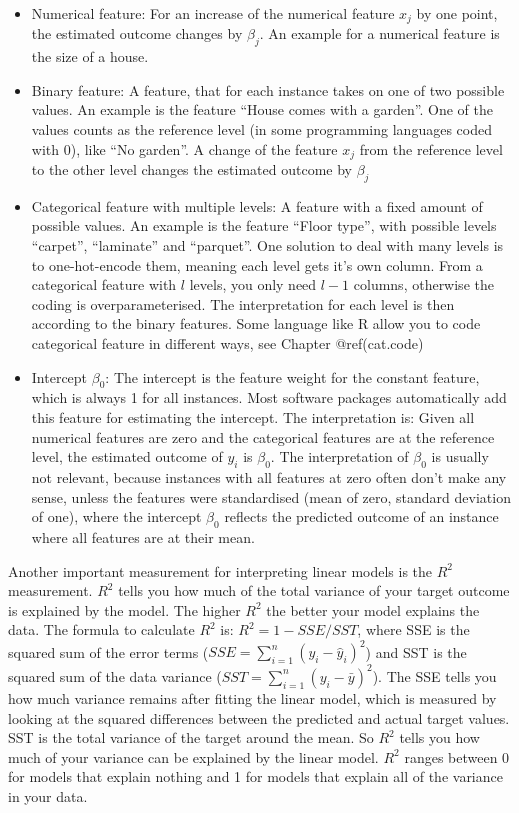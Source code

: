 \documentclass[12pt,]{krantz}
\providecommand{\tightlist}{%
  \setlength{\itemsep}{0pt}\setlength{\parskip}{0pt}}
\theoremstyle{definition}
\theoremstyle{definition}
\theoremstyle{definition}
\theoremstyle{remark}
\begin{document}
\begin{itemize}
\tightlist
\item
  Numerical feature: For an increase of the numerical feature \(x_{j}\)
  by one point, the estimated outcome changes by \(\beta_{j}\). An
  example for a numerical feature is the size of a house.
\item
  Binary feature: A feature, that for each instance takes on one of two
  possible values. An example is the feature ``House comes with a
  garden''. One of the values counts as the reference level (in some
  programming languages coded with 0), like ``No garden''. A change of
  the feature \(x_{j}\) from the reference level to the other level
  changes the estimated outcome by \(\beta_{j}\)
\item
  Categorical feature with multiple levels: A feature with a fixed
  amount of possible values. An example is the feature ``Floor type'',
  with possible levels ``carpet'', ``laminate'' and ``parquet''. One
  solution to deal with many levels is to one-hot-encode them, meaning
  each level gets it's own column. From a categorical feature with \(l\)
  levels, you only need \(l-1\) columns, otherwise the coding is
  overparameterised. The interpretation for each level is then according
  to the binary features. Some language like R allow you to code
  categorical feature in different ways, see Chapter @ref(cat.code)
\item
  Intercept \(\beta_{0}\): The intercept is the feature weight for the
  constant feature, which is always 1 for all instances. Most software
  packages automatically add this feature for estimating the intercept.
  The interpretation is: Given all numerical features are zero and the
  categorical features are at the reference level, the estimated outcome
  of \(y_{i}\) is \(\beta_{0}\). The interpretation of \(\beta_{0}\) is
  usually not relevant, because instances with all features at zero
  often don't make any sense, unless the features were standardised
  (mean of zero, standard deviation of one), where the intercept
  \(\beta_0\) reflects the predicted outcome of an instance where all
  features are at their mean.
\end{itemize}

Another important measurement for interpreting linear models is the
\(R^2\) measurement. \(R^2\) tells you how much of the total variance of
your target outcome is explained by the model. The higher \(R^2\) the
better your model explains the data. The formula to calculate \(R^2\)
is: \(R^2 = 1 - SSE/SST\), where SSE is the squared sum of the error
terms (\(SSE = \sum_{i=1}^n (y_i - \hat{y}_i)^2\)) and SST is the
squared sum of the data variance
(\(SST = \sum_{i=1}^n (y_i - \bar{y})^2\)). The SSE tells you how much
variance remains after fitting the linear model, which is measured by
looking at the squared differences between the predicted and actual
target values. SST is the total variance of the target around the mean.
So \(R^2\) tells you how much of your variance can be explained by the
linear model. \(R^2\) ranges between 0 for models that explain nothing
and 1 for models that explain all of the variance in your data.
\end{document}
